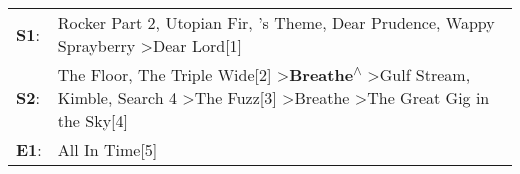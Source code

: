 \begin{supertabular}{p{0.03\textwidth}p{0.92\textwidth}}
 \textbf{S1}:  &                                                                                                                                                                                       Rocker Part 2\textsuperscript{}, \enspace Utopian Fir\textsuperscript{}, 's Theme\textsuperscript{}, \enspace Dear Prudence\textsuperscript{}, \enspace Wappy Sprayberry\textsuperscript{} \textgreater \enspace Dear Lord[1]\textsuperscript{}  \enspace  \\
 \textbf{S2}:  &  The Floor\textsuperscript{}, \enspace The Triple Wide[2]\textsuperscript{} \textgreater \enspace \textbf{Breathe\textsuperscript{$\wedge$}} \textgreater \enspace Gulf Stream\textsuperscript{}, \enspace Kimble\textsuperscript{}, \enspace Search 4\textsuperscript{} \textgreater \enspace The Fuzz[3]\textsuperscript{} \textgreater \enspace Breathe\textsuperscript{} \textgreater \enspace The Great Gig in the Sky[4]\textsuperscript{}  \enspace  \\
 \textbf{E1}:  &                                                                                                                                                                                                                                                                                                                                                                                                                 All In Time[5]\textsuperscript{}  \enspace  \\
\end{supertabular}
